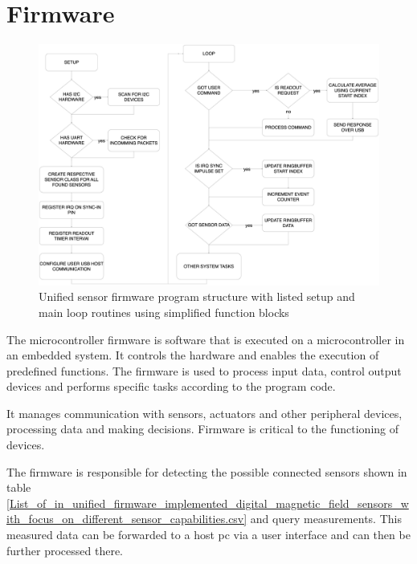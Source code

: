 \hypertarget{firmware}{%
\section{Firmware}\label{firmware}}

\begin{figure}
\centering
\includegraphics{./generated_images/border_Unified_sensor_firmware_program_structure_with_listed_setup_and_main_loop_routines_using_simplified_function_blocks.png}
\caption{Unified sensor firmware program structure with listed setup and
main loop routines using simplified function blocks
\label{Unified_sensor_firmware_program_structure_with_listed_setup_and_main_loop_routines_using_simplified_function_blocks.png}}
\end{figure}

The microcontroller firmware is software that is executed on a
microcontroller in an embedded system. It controls the hardware and
enables the execution of predefined functions. The firmware is used to
process input data, control output devices and performs specific tasks
according to the program code.

It manages communication with sensors, actuators and other peripheral
devices, processing data and making decisions. Firmware is critical to
the functioning of devices.

The firmware is responsible for detecting the possible connected sensors
shown in table
\ref{List_of_in_unified_firmware_implemented_digital_magnetic_field_sensors_with_focus_on_different_sensor_capabilities.csv}
and query measurements. This measured data can be forwarded to a host
\gls{pc} via a user interface and can then be further processed there.


